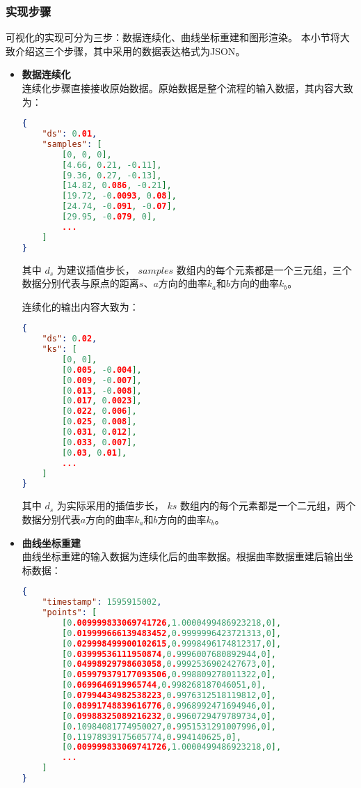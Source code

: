 \subsubsection{实现步骤}

可视化的实现可分为三步：数据连续化、曲线坐标重建和图形渲染。
本小节将大致介绍这三个步骤，其中采用的数据表达格式为JSON\cite{rfc7159}。

\begin{itemize}

\item \textbf{数据连续化} \\
连续化步骤直接接收原始数据。原始数据是整个流程的输入数据，其内容大致为：

\begin{lstlisting}[language=json,firstnumber=1,label={lst:raw-data},caption={原始曲率数据样例}]
{
    "ds": 0.01,
    "samples": [
        [0, 0, 0],
        [4.66, 0.21, -0.11],
        [9.36, 0.27, -0.13],
        [14.82, 0.086, -0.21],
        [19.72, -0.0093, 0.08],
        [24.74, -0.091, -0.07],
        [29.95, -0.079, 0],
        ...
    ]
}
\end{lstlisting}

其中 $d_s$ 为建议插值步长，
$samples$ 数组内的每个元素都是一个三元组，三个数据分别代表与原点的距离$s$、$a$方向的曲率$k_a$和$b$方向的曲率$k_b$。

连续化的输出内容大致为：

\begin{lstlisting}[language=json,firstnumber=1,label={lst:curvature-vec},caption={插值曲率数据样例}]
{
    "ds": 0.02,
    "ks": [
        [0, 0],
        [0.005, -0.004],
        [0.009, -0.007],
        [0.013, -0.008],
        [0.017, 0.0023],
        [0.022, 0.006],
        [0.025, 0.008],
        [0.031, 0.012],
        [0.033, 0.007],
        [0.03, 0.01],
        ...
    ]
}
\end{lstlisting}

其中 $d_s$ 为实际采用的插值步长，
$ks$ 数组内的每个元素都是一个二元组，两个数据分别代表$a$方向的曲率$k_a$和$b$方向的曲率$k_b$。

\item \textbf{曲线坐标重建} \\
曲线坐标重建的输入数据为连续化后的曲率数据。根据曲率数据重建后输出坐标数据：

\begin{lstlisting}[language=json,firstnumber=1,label={lst:positions},caption={重建坐标点数据样例}]
{
    "timestamp": 1595915002,
    "points": [
        [0.009999833069741726,1.0000499486923218,0],
        [0.019999666139483452,0.9999996423721313,0],
        [0.029998499900102615,0.9998496174812317,0],
        [0.03999536111950874,0.9996007680892944,0],
        [0.04998929798603058,0.9992536902427673,0],
        [0.059979379177093506,0.998809278011322,0],
        [0.0699646919965744,0.998268187046051,0],
        [0.07994434982538223,0.9976312518119812,0],
        [0.08991748839616776,0.9968992471694946,0],
        [0.09988325089216232,0.9960729479789734,0],
        [0.10984081774950027,0.9951531291007996,0],
        [0.11978939175605774,0.994140625,0],
        [0.009999833069741726,1.0000499486923218,0],
        ...
    ]
}
\end{lstlisting}


\end{itemize}
